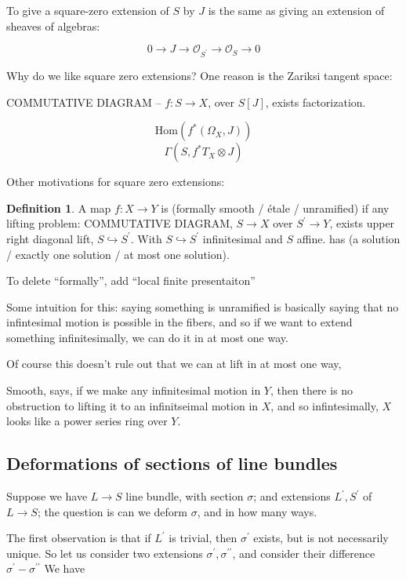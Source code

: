 \documentclass{amsart}
\theoremstyle{definition}
\newtheorem{definition}[dummy]{Definition}
\newcommand{\OO}{\mathcal{O}}
\newcommand{\Hom}{\text{Hom}}
\begin{document}
To give a square-zero extension of $S$ by $J$ is the same as giving an extension of sheaves of algebras:

$$0\to J\to\OO_{S^\prime}\to\OO_S\to 0$$

Why do we like square zero extensions?  One reason is the Zariksi tangent space:

COMMUTATIVE DIAGRAM -- $f:S\to X$, over $S[J]$, exists factorization.

$$\Hom(f^*(\Omega_X, J))$$
$$\Gamma(S, f^* T_X\otimes J)$$

Other motivations for square zero extensions:
\begin{definition}
A map $f:X\to Y$ is (formally smooth / \'etale / unramified) if any lifting problem:
COMMUTATIVE DIAGRAM, $S\to X$ over $S^\prime\to Y$, exists upper right diagonal lift, $S\hookrightarrow S^\prime$.  
With $S\hookrightarrow S^\prime$ infinitesimal and $S$ affine.
has (a solution / exactly one solution / at most one solution).

To delete ``formally'', add ``local finite presentaiton''
\end{definition}

Some intuition for this: saying something is unramified is basically saying that no infintesimal motion is possible in the fibers, and so if we want to extend something infinitesimally, we can do it in at most one way.  

Of course this doesn't rule out that we can at lift in at most one way,

Smooth, says, if we make any infinitesimal motion in $Y$, then there is no obstruction to lifting it to an infinitseimal motion in $X$, and so infintesimally, $X$ looks like a power series ring over $Y$.


\subsection{Deformations of sections of line bundles}

Suppose we have $L\to S$ line bundle, with section $\sigma$; and extensions $L^\prime, S^\prime$ of $L\to S$; the question is can we deform $\sigma$, and in how many ways.



The first observation is that if $L^\prime$ is trivial, then $\sigma^\prime$ exists, but is not necessarily unique.  So let us consider two extensions $\sigma^\prime, \sigma^{\prime\prime}$, and consider their difference $\sigma^\prime-\sigma^{\prime\prime}$
We have
\end{document}

